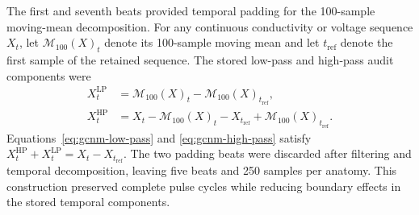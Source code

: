 \documentclass[11pt]{article}
\begin{document}
The first and seventh beats provided temporal padding for the 100-sample moving-mean decomposition.
For any continuous conductivity or voltage sequence $X_t$, let $\mathcal M_{100}(X)_t$ denote its 100-sample moving mean and let $t_{\mathrm{ref}}$ denote the first sample of the retained sequence.
The stored low-pass and high-pass audit components were
\begin{subequations}
\label{eq:gcnm-temporal-components}
\begin{align}
    X^{\mathrm{LP}}_t
    &=
    \mathcal M_{100}(X)_t-\mathcal M_{100}(X)_{t_{\mathrm{ref}}},
    \label{eq:gcnm-low-pass}\\
    X^{\mathrm{HP}}_t
    &=
    X_t-\mathcal M_{100}(X)_t
    -X_{t_{\mathrm{ref}}}
    +\mathcal M_{100}(X)_{t_{\mathrm{ref}}}.
    \label{eq:gcnm-high-pass}
\end{align}
\end{subequations}
Equations~\eqref{eq:gcnm-low-pass} and \eqref{eq:gcnm-high-pass} satisfy $X^{\mathrm{HP}}_t+X^{\mathrm{LP}}_t=X_t-X_{t_{\mathrm{ref}}}$.
The two padding beats were discarded after filtering and temporal decomposition, leaving five beats and 250 samples per anatomy.
This construction preserved complete pulse cycles while reducing boundary effects in the stored temporal components.
\end{document}
